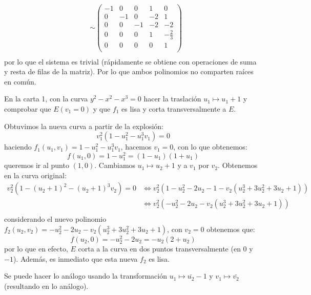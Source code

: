 \documentclass[12pt]{report}
\newcounter{it}
\theoremstyle{largebreak}
\begin{document}
\begin{sol}
\begin{equation*}
\begin{split}
            &\sim \left(
                \begin{array}{ccccc}
                    -1 & 0 & 0 & 1 & 0 \\
                    0 & -1 & 0 & -2 & 1 \\
                    0 & 0 & -1 & -2 & -2 \\
                    0 & 0 & 0 & 1 & -\frac{2}{3} \\
                    0 & 0 & 0 & 0 & 1 \\
                \end{array}
            \right)\\
            \end{split}
        \end{equation*}
        por lo que el sistema es trivial (rápidamente se obtiene con operaciones de suma y resta de filas de la matriz). Por lo que ambos polinomios no comparten raíces en común.
    \end{sol}

    \begin{excer}
        En la carta 1, con la curva $y^2-x^2-x^3=0$ hacer la traslación $u_1\mapsto u_1+1$ y comprobar que $E(v_1=0)$ y que $f_1$ es lisa y corta transversalmente a $E$.
    \end{excer}

    \begin{sol}
        Obtuvimos la nueva curva a partir de la explosión:
        \begin{equation*}
            v_1^2(1-u_1^2-u_1^3v_1)=0
        \end{equation*}
        haciendo $f_1(u_1,v_1)=1-u_1^2-u_1^3v_1$, hacemos $v_1=0$, con lo que obtenemos:
        \begin{equation*}
            f(u_1,0)=1-u_1^2=(1-u_1)(1+u_1)
        \end{equation*}
        queremos ir al punto $(1,0)$. Cambiamos $u_1\mapsto u_2+1$ y a $v_1$ por $v_2$. Obtenemos en la curva original:
        \begin{equation*}
            \begin{split}
                v_2^2(1-(u_2+1)^2-(u_2+1)^3v_2)=0&\iff v_2^2(1-u_2^2-2u_2-1-v_2(u_2^3+3u_2^2+3u_2+1))\\
                &\iff v_2^2(-u_2^2-2u_2-v_2(u_2^3+3u_2^2+3u_2+1))\\
            \end{split}
        \end{equation*}
        considerando el nuevo polinomio $f_2(u_2,v_2)=-u_2^2-2u_2-v_2(u_2^3+3u_2^2+3u_2+1)$, con $v_2=0$ obtenemos que:
        \begin{equation*}
            f(u_2,0)=-u_2^2-2u_2=-u_2(2+u_2)
        \end{equation*}
        por lo que en efecto, $E$ corta a la curva en dos puntos transversalmente (en $0$ y $-1$). Además, es inmediato que esta nueva $f_2$ es lisa.

        Se puede hacer lo análogo usando la transformación $u_1\mapsto \bar{u_2}-1$ y $v_1\mapsto\bar{v_2}$ (resultando en lo análogo).
    \end{sol}
\end{document}
